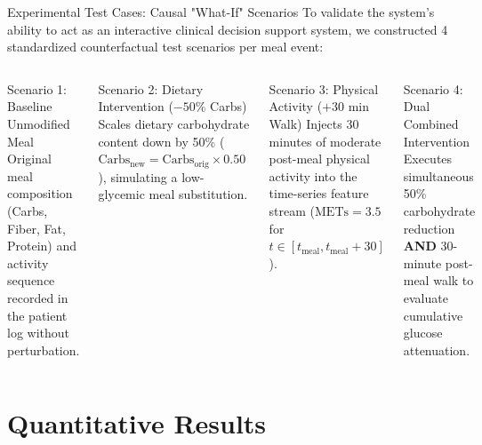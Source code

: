 \documentclass[10pt,aspectratio=169]{beamer}
\begin{document}
\begin{frame}{Experimental Test Cases: Causal "What-If" Scenarios}
    \justifying
    To validate the system's ability to act as an interactive clinical decision support system, we constructed 4 standardized counterfactual test scenarios per meal event:
    
    \vspace{0.3cm}
    \begin{columns}
        \begin{exampleblock}{Scenario 1: Baseline Unmodified Meal}
            \justifying
            Original meal composition (Carbs, Fiber, Fat, Protein) and activity sequence recorded in the patient log without perturbation.
        \end{exampleblock}
        \vspace{0.2cm}
        \begin{exampleblock}{Scenario 2: Dietary Intervention ($-50\%$ Carbs)}
            \justifying
            Scales dietary carbohydrate content down by 50\% ($\text{Carbs}_{\text{new}} = \text{Carbs}_{\text{orig}} \times 0.50$), simulating a low-glycemic meal substitution.
        \end{exampleblock}

        \begin{exampleblock}{Scenario 3: Physical Activity ($+30$ min Walk)}
            \justifying
            Injects 30 minutes of moderate post-meal physical activity into the time-series feature stream ($\text{METs} = 3.5$ for $t \in [t_{\text{meal}}, t_{\text{meal}}+30]$).
        \end{exampleblock}
        \vspace{0.2cm}
        \begin{exampleblock}{Scenario 4: Dual Combined Intervention}
            \justifying
            Executes simultaneous 50\% carbohydrate reduction \textbf{AND} 30-minute post-meal walk to evaluate cumulative glucose attenuation.
        \end{exampleblock}
    \end{columns}
\end{frame}

\section{Quantitative Results}
\end{document}
